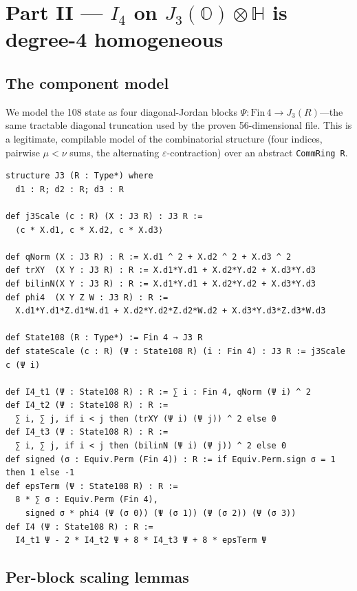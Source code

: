 \documentclass[11pt]{article}
\theoremstyle{definition}
\newcommand{\OO}{\mathbb{O}}
\newcommand{\HH}{\mathbb{H}}
\newcommand{\Jthree}{J_3(\OO)}
\newcommand{\Iq}{I_4}
\begin{document}
\section{Part II --- $\Iq$ on $\Jthree\otimes\HH$ is degree-4 homogeneous}
\label{sec:state108}

\subsection{The component model}
\label{sec:state108-model}

We model the 108 state as four diagonal-Jordan blocks
$\Psi : \mathrm{Fin}\,4 \to J_3(R)$---the same tractable diagonal truncation
used by the proven 56-dimensional file. This is a legitimate, compilable model
of the combinatorial structure (four indices, pairwise $\mu<\nu$ sums, the
alternating $\varepsilon$-contraction) over an abstract \texttt{CommRing R}.

\begin{lstlisting}[language=leanL,caption={State, norms, and the four I4 terms
  (GKN\_I4\_State108.lean).}]
structure J3 (R : Type*) where
  d1 : R; d2 : R; d3 : R

def j3Scale (c : R) (X : J3 R) : J3 R :=
  ⟨c * X.d1, c * X.d2, c * X.d3⟩

def qNorm (X : J3 R) : R := X.d1 ^ 2 + X.d2 ^ 2 + X.d3 ^ 2
def trXY  (X Y : J3 R) : R := X.d1*Y.d1 + X.d2*Y.d2 + X.d3*Y.d3
def bilinN(X Y : J3 R) : R := X.d1*Y.d1 + X.d2*Y.d2 + X.d3*Y.d3
def phi4  (X Y Z W : J3 R) : R :=
  X.d1*Y.d1*Z.d1*W.d1 + X.d2*Y.d2*Z.d2*W.d2 + X.d3*Y.d3*Z.d3*W.d3

def State108 (R : Type*) := Fin 4 → J3 R
def stateScale (c : R) (Ψ : State108 R) (i : Fin 4) : J3 R := j3Scale c (Ψ i)

def I4_t1 (Ψ : State108 R) : R := ∑ i : Fin 4, qNorm (Ψ i) ^ 2
def I4_t2 (Ψ : State108 R) : R :=
  ∑ i, ∑ j, if i < j then (trXY (Ψ i) (Ψ j)) ^ 2 else 0
def I4_t3 (Ψ : State108 R) : R :=
  ∑ i, ∑ j, if i < j then (bilinN (Ψ i) (Ψ j)) ^ 2 else 0
def signed (σ : Equiv.Perm (Fin 4)) : R := if Equiv.Perm.sign σ = 1 then 1 else -1
def epsTerm (Ψ : State108 R) : R :=
  8 * ∑ σ : Equiv.Perm (Fin 4),
    signed σ * phi4 (Ψ (σ 0)) (Ψ (σ 1)) (Ψ (σ 2)) (Ψ (σ 3))
def I4 (Ψ : State108 R) : R :=
  I4_t1 Ψ - 2 * I4_t2 Ψ + 8 * I4_t3 Ψ + 8 * epsTerm Ψ
\end{lstlisting}

\subsection{Per-block scaling lemmas}
\label{sec:state108-lemmas}
\end{document}
